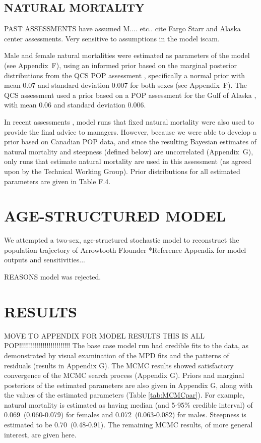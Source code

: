 \documentclass[11pt]{book}\usepackage[]{graphicx}\usepackage[]{color}
\begin{document}
\subsection{NATURAL MORTALITY}

PAST ASSESSMENTS have assumed M.... etc.. cite Fargo Starr and Alaska center assessments. Very sensitive to assumptions in the model iscam.

Male and female natural mortalities were estimated as parameters of the model (see Appendix~F), using an informed prior based on the marginal posterior distributions from the QCS POP assessment , specifically a normal prior with mean 0.07 and standard deviation 0.007 for both sexes (see Appendix~F). The QCS assessment used a prior based on a POP assessment for the Gulf of Alaska , with mean 0.06 and standard deviation 0.006.

In recent assessments , model runs that fixed natural mortality were also used to provide the final advice to managers. However, because we were able to develop a prior based on Canadian POP data, and since the resulting Bayesian estimates of natural mortality and steepness (defined below) are uncorrelated (Appendix~G), only runs that estimate natural mortality are used in this assessment (as agreed upon by the Technical Working Group). Prior distributions for all estimated parameters are given in Table F.4.

\section{AGE-STRUCTURED MODEL}

We attempted a two-sex, age-structured stochastic model to reconstruct the population trajectory of Arrowtooth Flounder
*Reference Appendix for model outputs and sensitivities...

REASONS model was rejected.

\section{RESULTS}

MOVE TO APPENDIX FOR MODEL RESULTS
THIS IS ALL POP!!!!!!!!!!!!!!!!!!!!!!!!!!
The base case model run had credible fits to the data, as demonstrated by visual examination of the MPD fits and the patterns of residuals (results in Appendix G). The MCMC results showed satisfactory convergence of the MCMC search process (Appendix G). Priors and marginal posteriors of the estimated parameters are also given in Appendix G, along with the values of the estimated parameters (Table \ref{tab:MCMCpar}). For example, natural mortality is estimated as having median (and 5-95\% credible interval) of 0.069~(0.060-0.079) for females and 0.072~(0.063-0.082) for males. Steepness is estimated to be 0.70~(0.48-0.91). The remaining MCMC results, of more general interest, are given here.
\end{document}
